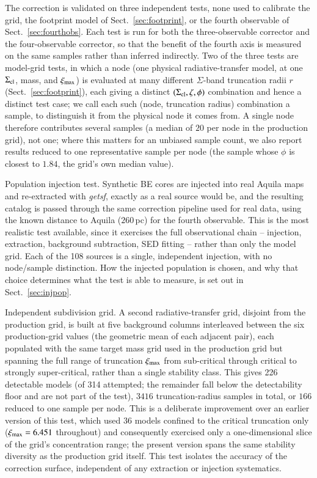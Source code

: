\documentclass{aa}
\newcommand{\Scloud}{\Sigma_{\rm cl}}
\newcommand{\ximax}{\xi_{\rm max}}
\begin{document}
The correction is validated on three independent tests, none used to
calibrate the grid, the footprint model of Sect.~\ref{sec:footprint}, or
the fourth observable of Sect.~\ref{sec:fourthobs}. Each test is run for
both the three-observable corrector and the four-observable corrector, so
that the benefit of the fourth axis is measured on the same samples rather
than inferred indirectly. Two of the three tests are model-grid tests, in
which a node (one physical radiative-transfer model, at one $\Scloud$, mass, and
$\ximax$) is evaluated at many different $\Sigma$-band truncation radii $r$
(Sect.~\ref{sec:footprint}), each giving a distinct
$(\Scloud,\zeta,\phi)$ combination and hence a
distinct test case; we call each such (node, truncation radius)
combination a sample, to distinguish it from the physical node it
comes from. A single node therefore contributes several samples (a median
of $20$ per node in the production grid), not one; where this matters for
an unbiased sample count, we also report results reduced to one
representative sample per node (the sample whose $\phi$ is closest
to $1.84$, the grid's own median value).

Population injection test. Synthetic BE cores are injected into real Aquila
maps and
re-extracted with \emph{getsf}, exactly as a real source would be, and the
resulting catalog is passed through the same correction pipeline used for
real data, using the known distance to Aquila ($260\,$pc) for the fourth
observable. This is the most realistic test available, since it exercises
the full observational chain -- injection, extraction, background
subtraction, SED fitting -- rather than only the model grid. Each of the
108 sources is a single, independent injection, with no node/sample
distinction. How the injected population is chosen, and why that choice
determines what the test is able to measure, is set out in
Sect.~\ref{sec:injpop}.

Independent subdivision grid. A second radiative-transfer grid, disjoint from the
production grid, is built at five background columns interleaved between
the six production-grid values (the geometric mean of each adjacent pair),
each populated with the same target mass grid used in the production grid
but spanning the full range of truncation $\ximax$ from sub-critical
through critical to strongly super-critical, rather than a single
stability class. This gives 226 detectable models (of 314 attempted; the
remainder fall below the detectability floor and are not part of the
test), $3416$ truncation-radius samples in total, or $166$ reduced to one
sample per node. This is a deliberate improvement over an earlier version
of this test, which used $36$ models confined to the critical truncation
only ($\ximax=6.451$ throughout) and consequently exercised only a
one-dimensional slice of the grid's concentration range; the present
version spans the same stability diversity as the production grid itself.
This test isolates the accuracy of the correction surface, independent of
any extraction or injection systematics.
\end{document}
